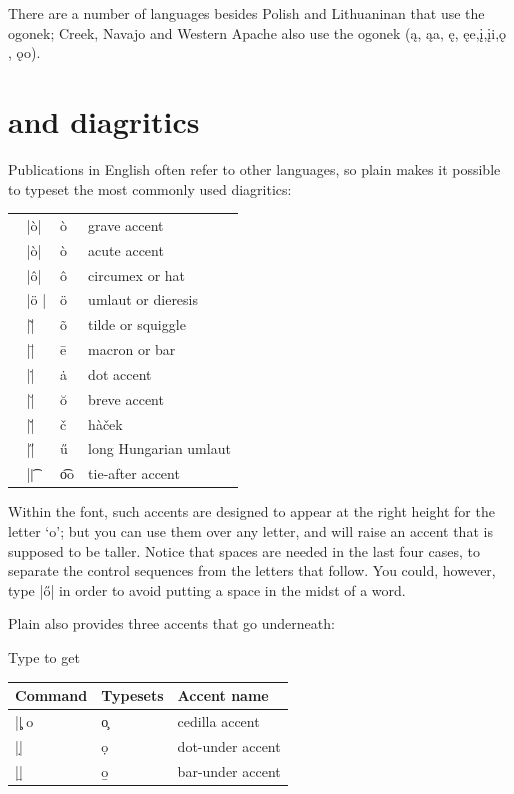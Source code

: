   \scalebox{10}{\L} \scalebox{10}{\l}

There are a number of languages besides Polish and Lithuaninan that use the ogonek; Creek, Navajo and Western Apache also use the ogonek (\k{a}, \k{aa}, \k{e}, \k{ee},\k{i},\k{ii},\k{o} , \k{oo}).


\section{\protect\tex and diagritics}

Publications in English often refer to other languages, so plain
\tex makes it possible to typeset the most commonly used diagritics:


\begin{table}[htbp]
\centering
\begin{tabular}{lll}
\toprule
~ |\`o|   &\`o  & grave accent  \\
~ |\`o|   &\`o  & acute accent         \\
~ |\^o|  &\^o  & circumex or hat  \\
~ |\"o |  &\"o & umlaut or dieresis \\
~ |\~|   & \~o & tilde or squiggle \\
~ |\=|   &\=e & macron or bar \\
~ |\.|   &\.a  & dot accent \\
~ |\u|   &\u{o}  & breve accent \\
~ |\v|   &\v{c}  & h\`a\v{c}ek \\
~ |\H|   &\H{u}  & long Hungarian umlaut\\
~ |\t|    &\t{oo}  & tie-after accent \\
\bottomrule
\end{tabular}
\end{table}



Within the font, such accents are designed to appear at the right height for the
letter `o'; but you can use them over any letter, and \tex will raise an accent that
is supposed to be taller. Notice that spaces are needed in the last four cases, to
separate the control sequences from the letters that follow. You could, however,
type |\H{o}|  in order to avoid putting a space in the midst of a word.

Plain \tex  also provides three accents that go underneath:

Type to get

\begin{tabular}{lll}
\toprule
Command & Typesets & Accent name\\
\midrule
|\c| o &\c{o}  & cedilla accent\\
|\d|   &\d{o}  & dot-under accent\\
|\b|   &\b{o}  & bar-under accent\\
\bottomrule
\end{tabular}


